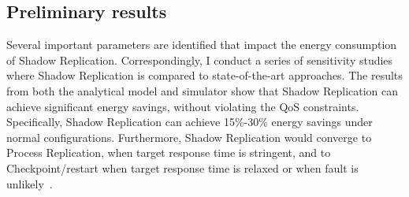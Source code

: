 \subsection{Preliminary results}
Several important parameters are identified that impact the energy consumption of Shadow Replication. Correspondingly, I conduct a series of sensitivity studies where Shadow Replication is compared to state-of-the-art approaches. %
The results from both the analytical model and simulator show that Shadow Replication can achieve significant energy savings, without violating the QoS constraints. %
Specifically, Shadow Replication can achieve 15\%-30\% energy savings under normal configurations. Furthermore, Shadow Replication would converge to Process Replication, when target response time is stringent, and to Checkpoint/restart when target response time is relaxed or when fault is unlikely~\cite{cui_closer_2014}.

